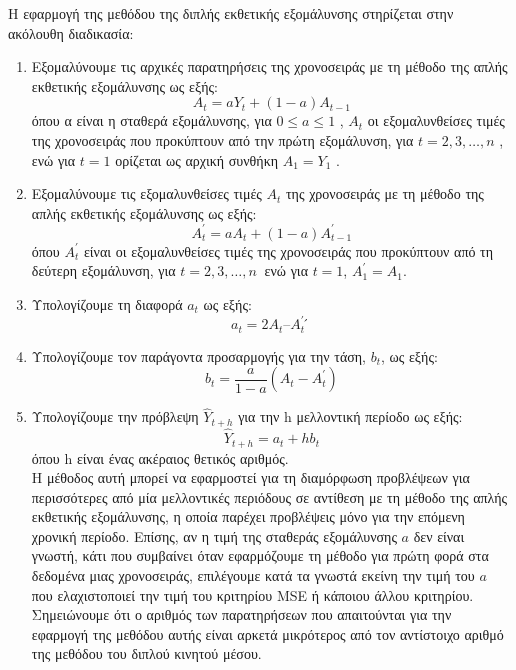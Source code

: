 Η εφαρμογή της μεθόδου της διπλής εκθετικής εξομάλυνσης στηρίζεται στην
ακόλουθη διαδικασία:\\
\begin{enumerate}
\item  Εξομαλύνουμε τις αρχικές παρατηρήσεις της χρονοσειράς με τη μέθοδο της απλής
εκθετικής εξομάλυνσης ως εξής:\\
$$ A_t=aY_t + \left(1-a\right) A_{t-1} $$
όπου α είναι η σταθερά εξομάλυνσης, για $ 0 \leq a \leq 1 $ , $ A_t $ οι εξομαλυνθείσες τιμές της
χρονοσειράς που προκύπτουν από την πρώτη εξομάλυνση, για $ t = 2,3,\ldots,n $ , ενώ για
$t=1$ ορίζεται ως αρχική συνθήκη $ A_1 = Y_1 $ .

\item Εξομαλύνουμε τις εξομαλυνθείσες τιμές $A_t$ της χρονοσειράς με τη μέθοδο της
απλής εκθετικής εξομάλυνσης ως εξής:\\
$$ A^{'}_t=aA_t + \left(1-a\right) A^{'}_{t-1} $$
όπου $A^{'}_t$ είναι οι εξομαλυνθείσες τιμές της χρονοσειράς που προκύπτουν από τη
δεύτερη εξομάλυνση, για $t = 2,3,\dots,n\:$ ενώ για $t=1$, $A^{'}_1 =A_1$.

\item Υπολογίζουμε τη διαφορά $a_t$ ως εξής:
$$a_t = 2 A_t – A^{'}_t ́$$

\item Υπολογίζουμε τον παράγοντα προσαρμογής για την τάση, $b_t$, ως εξής:\\
$$ b_t=\frac{a}{1-a} \left(A_t - A^{'}_t \right) $$

\item Υπολογίζουμε την πρόβλεψη $ \widehat{Y}_{t+h} $ για την h μελλοντική περίοδο ως εξής:\\
$$ \widehat{Y}_{t+h}=a_t+hb_t  $$
όπου h είναι ένας ακέραιος θετικός αριθμός.\\

Η μέθοδος αυτή μπορεί να εφαρμοστεί για τη διαμόρφωση προβλέψεων για
περισσότερες από μία μελλοντικές περιόδους σε αντίθεση με τη μέθοδο της απλής
εκθετικής εξομάλυνσης, η οποία παρέχει προβλέψεις μόνο για την επόμενη χρονική
περίοδο. Επίσης, αν η τιμή της σταθεράς εξομάλυνσης $a$ δεν είναι γνωστή, κάτι που
συμβαίνει όταν εφαρμόζουμε τη μέθοδο για πρώτη φορά στα δεδομένα μιας
χρονοσειράς, επιλέγουμε κατά τα γνωστά εκείνη την τιμή του $a$ που ελαχιστοποιεί
την τιμή του κριτηρίου MSE ή κάποιου άλλου κριτηρίου. Σημειώνουμε ότι ο αριθμός
των παρατηρήσεων που απαιτούνται για την εφαρμογή της μεθόδου αυτής είναι αρκετά μικρότερος από τον αντίστοιχο αριθμό της μεθόδου του διπλού κινητού
μέσου.
 
\end{enumerate}
